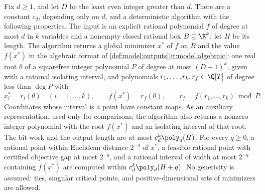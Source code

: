 \begin{theorem}\label{thm:int:solver}
Fix $d\ge1$, and let $D$ be the least even integer greater than $d$. There
are a constant $c_d$, depending only on $d$, and a deterministic algorithm
with the following properties. The input is an explicit rational polynomial
$f$ of degree at most $d$ in $k$ variables and a nonempty closed rational box
$B\subseteq\R^k$; let $H$ be its length. The algorithm returns a global
minimizer $x^*$ of $f$ on $B$ and the value $f(x^*)$ in the algebraic format
of \cref{def:model:outputs}\ref{it:model:algebraic}: one real root $\theta$
of a squarefree integer polynomial $P$ of degree at most $(D-1)^k$, given
with a rational isolating interval, and polynomials
$r_1,\ldots,r_k,r_f\in\Q[T]$ of degree less than $\deg P$ with
\[
 x^*_i=r_i(\theta)\quad(i=1,\ldots,k),\qquad
 f(x^*)=r_f(\theta),\qquad
 r_f=f(r_1,\ldots,r_k)\bmod P .
\]
Coordinates whose interval is a point have constant maps. As an auxiliary
representation, used only for comparisons, the algorithm also returns a
nonzero integer polynomial with the root $f(x^*)$ and an isolating interval
of that root. The bit work and the output length are at most
$c_d^k\poly_d(H)$. For every $q\ge0$, a rational point within Euclidean
distance $2^{-q}$ of $x^*$, a feasible rational point with certified
objective gap at most $2^{-q}$, and a rational interval of width at most
$2^{-q}$ containing $f(x^*)$ are computed within $c_d^k\poly_d(H+q)$. No
genericity is assumed: ties, singular critical points, and
positive-dimensional sets of minimizers are allowed.
\end{theorem}

